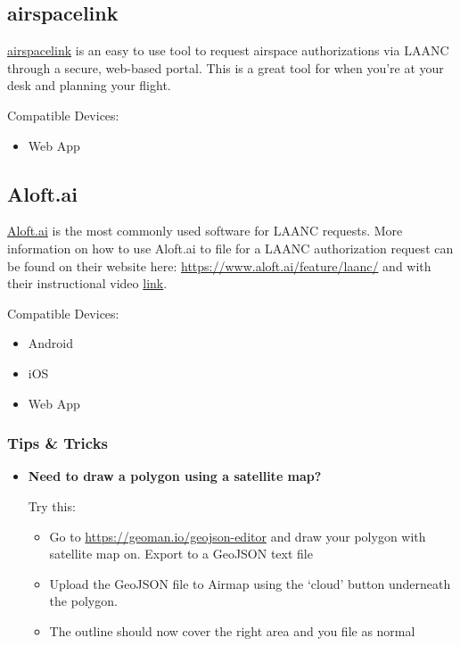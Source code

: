 \documentclass[
  12pt,
]{book}
\providecommand{\tightlist}{%
  \setlength{\itemsep}{0pt}\setlength{\parskip}{0pt}}
\begin{document}
\hypertarget{airspacelink}{%
\subsection{airspacelink}\label{airspacelink}}

\href{https://airspacelink.com/}{airspacelink} is an easy to use tool to request airspace authorizations via LAANC through a secure, web-based portal. This is a great tool for when you're at your desk and planning your flight.

Compatible Devices:

\begin{itemize}
\tightlist
\item
  Web App
\end{itemize}

\hypertarget{aloft.ai}{%
\subsection{Aloft.ai}\label{aloft.ai}}

\href{https://www.aloft.ai/}{Aloft.ai} is the most commonly used software for LAANC requests. More information on how to use Aloft.ai to file for a LAANC authorization request can be found on their website here: \url{https://www.aloft.ai/feature/laanc/} and with their instructional video \href{https://www.youtube.com/watch?v=kVl7R0XWz2k\&ab_channel=Aloft}{link}.

Compatible Devices:

\begin{itemize}
\tightlist
\item
  Android
\item
  iOS
\item
  Web App
\end{itemize}

\hypertarget{tips-tricks}{%
\subsubsection{Tips \& Tricks}\label{tips-tricks}}

\begin{itemize}
\item
  \textbf{Need to draw a polygon using a satellite map?}

  Try this:

  \begin{itemize}
  \tightlist
  \item
    Go to \url{https://geoman.io/geojson-editor} and draw your polygon with satellite map on. Export to a GeoJSON text file
  \item
    Upload the GeoJSON file to Airmap using the `cloud' button underneath the polygon.
  \item
    The outline should now cover the right area and you file as normal
  \end{itemize}
\end{itemize}
\end{document}
